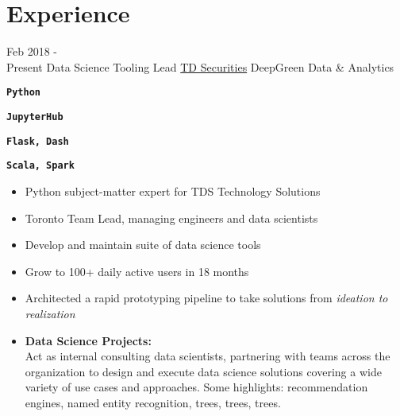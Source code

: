 \documentclass[letterpaper]{twentysecondcv} %
\begin{document}
\makeprofile %

\newcommand{\skill}[1]{\texttt{\textbf{#1}}}


\section{Experience}

\begin{twenty} %

	\twentyitem
		{Feb 2018 - \\ Present}
		{Data Science Tooling Lead}
		{\href{https://www.tdsecurities.com}{TD Securities}}
		{DeepGreen Data \& Analytics}
		{
		\item\skill{Python}
		\item
		\item\skill{JupyterHub}
		\item
		\item\skill{Flask, Dash}
		\item\skill{Scala, Spark}
		}
		{
			\begin{itemize}
				
					\item Python subject-matter expert for TDS Technology Solutions
					\item Toronto Team Lead, managing engineers and data scientists
					\item Develop and maintain suite of data science tools
					\item Grow to 100+ daily active users in 18 months
					\item Architected a rapid prototyping pipeline to take solutions from \emph{ideation to realization}
					
				\item \textbf{Data Science Projects:}\\
				Act as internal consulting data scientists, partnering with teams across the organization to design and execute data science solutions covering a wide variety of use cases and approaches. Some highlights: recommendation engines, named entity recognition, trees, trees, trees.
			\end{itemize}
		}	
		

\end{twenty}
\end{document}
